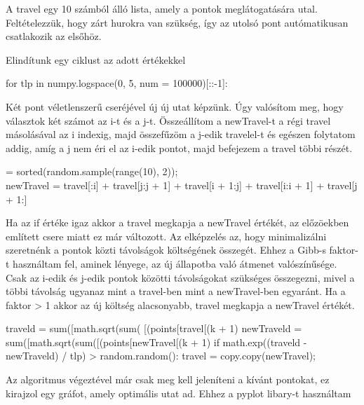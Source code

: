 A travel egy 10 számból álló lista, amely a pontok meglátogatására utal. Feltételezzük, hogy zárt hurokra van szükség, így az utolsó pont autómatikusan csatlakozik az elsőhöz.


\begin{python}
travel = random.sample(range(10), 10);}
\end{python}

Elindítunk egy ciklust az adott értékekkel


\begin{python}
for tlp in numpy.logspace(0, 5, num = 100000)[::-1]:
\end{python}


Két pont véletlenszerű cseréjével új új utat képzünk. Úgy valósítom meg, hogy választok két számot az i-t és a j-t. Összeállítom a newTravel-t a régi travel másolásával az i indexig, majd összefűzöm a j-edik travelel-t és egészen folytatom addig, amíg a j nem éri el az i-edik pontot, majd befejezem a travel többi részét.


\begin{python}
[i, j] = sorted(random.sample(range(10), 2)); \\
newTravel = travel[:i] + travel[j:j + 1] + travel[i + 1:j] + travel[i:i + 1] + travel[j + 1:]
\end{python}


Ha az if értéke igaz akkor a travel megkapja a newTravel értékét, az előzöekben említett csere miatt ez már változott. Az elképzelés az, hogy minimalizálni szeretnénk a pontok közti távolságok költségének összegét. Ehhez a Gibb-s faktor-t használtam fel, aminek lényege, az új állapotba való átmenet valószínűsége. Csak az i-edik és j-edik pontok közötti távolságokat szükséges összegezni, mivel a többi távolság ugyanaz mint a travel-ben mint a newTravel-ben egyaránt. Ha a faktor > 1 akkor az új költség alacsonyabb, travel megkapja a newTravel értékét.


\begin{python}
traveld = sum([math.sqrt(sum( [(points[travel[(k + 1) %
    newTraveld = sum([math.sqrt(sum([(points[newTravel[(k + 1) %
    if math.exp((traveld - newTraveld) / tlp) > random.random():
        travel = copy.copy(newTravel);
\end{python}        


Az algoritmus végeztével már csak meg kell jeleníteni a kívánt pontokat, ez kirajzol egy gráfot, amely optimális utat ad. Ehhez a pyplot libary-t használtam


